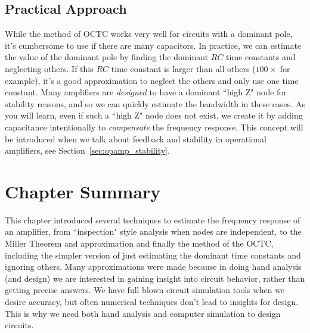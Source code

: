 \subsection{Practical Approach}
While the method of OCTC works very well for circuits with a dominant pole, it's cumbersome to use if there are many capacitors.  In practice, we can estimate the value of the dominant pole by finding the dominant $RC$ time constants and neglecting others.  If this $RC$ time constant is larger than all others ($100\times$ for example), it's a good approximation to neglect the others and only use one time constant. Many amplifiers are \textit{designed} to have a dominant ``high Z" node for stability reasons, and so we can quickly estimate the bandwidth in these cases.  As you will learn, even if such a ``high Z" node does not exist, we create it by adding capacitance intentionally to \textit{compensate} the frequency response.  This concept will be introduced when we talk about feedback and stability in operational amplifiers, see Section~\ref{sec:opamp_stability}.
\section{Chapter Summary}
This chapter introduced several techniques to estimate the frequency response of an amplifier, from ``inspection" style analysis when nodes are independent, to the Miller Theorem and approximation and finally the method of the OCTC, including the simpler version of just estimating the dominant time constants and ignoring others.  Many approximations were made because in doing hand analysis (and design) we are interested in gaining insight into circuit behavior, rather than getting precise answers.  We have full blown circuit simulation tools when we desire accuracy, but often numerical techniques don't lead to insights for design.  This is why we need both hand analysis and computer simulation to design circuits.
